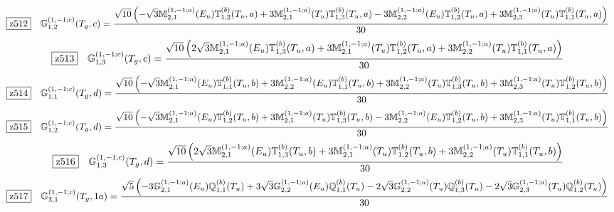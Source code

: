 \documentclass[fleqn,10pt,landscape]{jsarticle}
\begin{document}
\begin{dmath*}
\hspace*{3mm}\fbox{z512}\quad \mathbb{G}_{1,2}^{(1,-1;c)}(T_{g},c)=\frac{\sqrt{10} \left(- \sqrt{3} \mathbb{M}_{2,1}^{(1,-1;a)}(E_{u}) \mathbb{T}_{1,2}^{(b)}(T_{u},a) + 3 \mathbb{M}_{2,1}^{(1,-1;a)}(T_{u}) \mathbb{T}_{1,3}^{(b)}(T_{u},a) - 3 \mathbb{M}_{2,2}^{(1,-1;a)}(E_{u}) \mathbb{T}_{1,2}^{(b)}(T_{u},a) + 3 \mathbb{M}_{2,3}^{(1,-1;a)}(T_{u}) \mathbb{T}_{1,1}^{(b)}(T_{u},a)\right)}{30}
\end{dmath*}
\begin{dmath*}
\hspace*{3mm}\fbox{z513}\quad \mathbb{G}_{1,3}^{(1,-1;c)}(T_{g},c)=\frac{\sqrt{10} \left(2 \sqrt{3} \mathbb{M}_{2,1}^{(1,-1;a)}(E_{u}) \mathbb{T}_{1,3}^{(b)}(T_{u},a) + 3 \mathbb{M}_{2,1}^{(1,-1;a)}(T_{u}) \mathbb{T}_{1,2}^{(b)}(T_{u},a) + 3 \mathbb{M}_{2,2}^{(1,-1;a)}(T_{u}) \mathbb{T}_{1,1}^{(b)}(T_{u},a)\right)}{30}
\end{dmath*}
\begin{dmath*}
\hspace*{3mm}\fbox{z514}\quad \mathbb{G}_{1,1}^{(1,-1;c)}(T_{g},d)=\frac{\sqrt{10} \left(- \sqrt{3} \mathbb{M}_{2,1}^{(1,-1;a)}(E_{u}) \mathbb{T}_{1,1}^{(b)}(T_{u},b) + 3 \mathbb{M}_{2,2}^{(1,-1;a)}(E_{u}) \mathbb{T}_{1,1}^{(b)}(T_{u},b) + 3 \mathbb{M}_{2,2}^{(1,-1;a)}(T_{u}) \mathbb{T}_{1,3}^{(b)}(T_{u},b) + 3 \mathbb{M}_{2,3}^{(1,-1;a)}(T_{u}) \mathbb{T}_{1,2}^{(b)}(T_{u},b)\right)}{30}
\end{dmath*}
\begin{dmath*}
\hspace*{3mm}\fbox{z515}\quad \mathbb{G}_{1,2}^{(1,-1;c)}(T_{g},d)=\frac{\sqrt{10} \left(- \sqrt{3} \mathbb{M}_{2,1}^{(1,-1;a)}(E_{u}) \mathbb{T}_{1,2}^{(b)}(T_{u},b) + 3 \mathbb{M}_{2,1}^{(1,-1;a)}(T_{u}) \mathbb{T}_{1,3}^{(b)}(T_{u},b) - 3 \mathbb{M}_{2,2}^{(1,-1;a)}(E_{u}) \mathbb{T}_{1,2}^{(b)}(T_{u},b) + 3 \mathbb{M}_{2,3}^{(1,-1;a)}(T_{u}) \mathbb{T}_{1,1}^{(b)}(T_{u},b)\right)}{30}
\end{dmath*}
\begin{dmath*}
\hspace*{3mm}\fbox{z516}\quad \mathbb{G}_{1,3}^{(1,-1;c)}(T_{g},d)=\frac{\sqrt{10} \left(2 \sqrt{3} \mathbb{M}_{2,1}^{(1,-1;a)}(E_{u}) \mathbb{T}_{1,3}^{(b)}(T_{u},b) + 3 \mathbb{M}_{2,1}^{(1,-1;a)}(T_{u}) \mathbb{T}_{1,2}^{(b)}(T_{u},b) + 3 \mathbb{M}_{2,2}^{(1,-1;a)}(T_{u}) \mathbb{T}_{1,1}^{(b)}(T_{u},b)\right)}{30}
\end{dmath*}
\begin{dmath*}
\hspace*{3mm}\fbox{z517}\quad \mathbb{G}_{3,1}^{(1,-1;c)}(T_{g},1a)=\frac{\sqrt{5} \left(- 3 \mathbb{G}_{2,1}^{(1,-1;a)}(E_{u}) \mathbb{Q}_{1,1}^{(b)}(T_{u}) + 3 \sqrt{3} \mathbb{G}_{2,2}^{(1,-1;a)}(E_{u}) \mathbb{Q}_{1,1}^{(b)}(T_{u}) - 2 \sqrt{3} \mathbb{G}_{2,2}^{(1,-1;a)}(T_{u}) \mathbb{Q}_{1,3}^{(b)}(T_{u}) - 2 \sqrt{3} \mathbb{G}_{2,3}^{(1,-1;a)}(T_{u}) \mathbb{Q}_{1,2}^{(b)}(T_{u})\right)}{30}
\end{dmath*}
\end{document}
